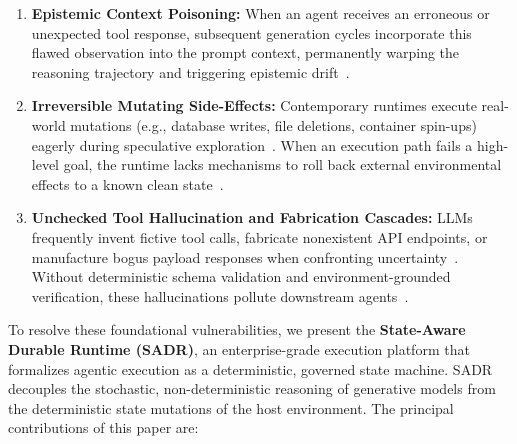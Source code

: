 \documentclass[10pt,journal,compsoc]{IEEEtran}
\begin{document}
\begin{enumerate}
    \item \textbf{Epistemic Context Poisoning:} When an agent receives an erroneous or unexpected tool response, subsequent generation cycles incorporate this flawed observation into the prompt context, permanently warping the reasoning trajectory and triggering epistemic drift~\cite{lam2026ssgm, bousetouane2026acc, ji2023survey_hallucination}.
    \item \textbf{Irreversible Mutating Side-Effects:} Contemporary runtimes execute real-world mutations (e.g., database writes, file deletions, container spin-ups) eagerly during speculative exploration~\cite{burckhardt2021durable, li2024dse}. When an execution path fails a high-level goal, the runtime lacks mechanisms to roll back external environmental effects to a known clean state~\cite{wu2026crab, zheng2026rewind}.
    \item \textbf{Unchecked Tool Hallucination and Fabrication Cascades:} LLMs frequently invent fictive tool calls, fabricate nonexistent API endpoints, or manufacture bogus payload responses when confronting uncertainty~\cite{deng2026autopilot, huang2023survey_hallucination, dhuliawala2023cove}. Without deterministic schema validation and environment-grounded verification, these hallucinations pollute downstream agents~\cite{manakul2023selfcheck}.
\end{enumerate}

To resolve these foundational vulnerabilities, we present the \textbf{State-Aware Durable Runtime (SADR)}, an enterprise-grade execution platform that formalizes agentic execution as a deterministic, governed state machine. SADR decouples the stochastic, non-deterministic reasoning of generative models from the deterministic state mutations of the host environment. The principal contributions of this paper are:
\end{document}

